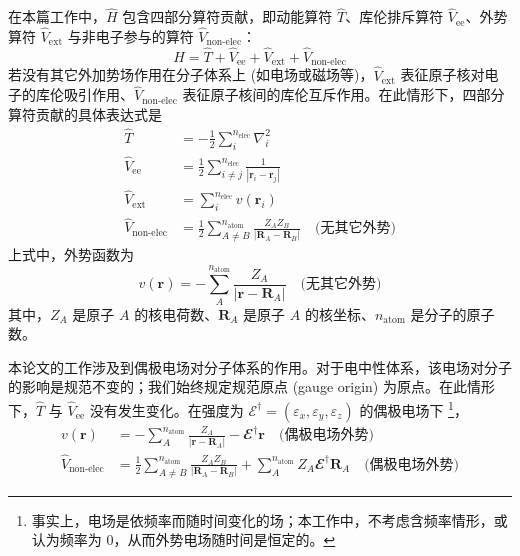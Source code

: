 在本篇工作中，$\hat H$ 包含四部分算符贡献，即动能算符 $\hat T$、库伦排斥算符 $\hat V_\mathrm{ee}$、外势算符 $\hat V_\mathrm{ext}$ 与非电子参与的算符 $\hat V_\text{non-elec}$：
\begin{equation}
  \hat H = \hat T + \hat V_\mathrm{ee} + \hat V_\mathrm{ext} + \hat V_\text{non-elec}
\end{equation}
若没有其它外加势场作用在分子体系上 (如电场或磁场等)，$\hat V_\mathrm{ext}$ 表征原子核对电子的库伦吸引作用、$\hat V_\text{non-elec}$ 表征原子核间的库伦互斥作用。在此情形下，四部分算符贡献的具体表达式是
\begin{align}
  \hat T &= - \frac{1}{2} \sum_i^{n_\mathrm{elec}} \nabla_i^2 \\
  \hat V_\mathrm{ee} &= \frac{1}{2} \sum_{i \neq j}^{n_\mathrm{elec}} \frac{1}{| \bm{r}_i - \bm{r}_j |} \\
  \hat V_\mathrm{ext} &= \sum_{i}^{n_\mathrm{elec}} v (\bm{r}_i) \\
  \hat V_\text{non-elec} &= \frac{1}{2} \sum_{A \neq B}^{n_\mathrm{atom}} \frac{Z_A Z_B}{| \bm{R}_A  - \bm{R}_B |} \quad \text{(无其它外势)}
\end{align}
上式中，外势函数为
\begin{equation}
  v (\bm{r}) = - \sum_{A}^{n_\mathrm{atom}} \frac{Z_A}{| \bm{r} - \bm{R}_A |} \quad \text{(无其它外势)}
\end{equation}
其中，$Z_A$ 是原子 $A$ 的核电荷数、$\bm{R}_A$ 是原子 $A$ 的核坐标、$n_\mathrm{atom}$ 是分子的原子数。

本论文的工作涉及到偶极电场对分子体系的作用。对于电中性体系，该电场对分子的影响是规范不变的；我们始终规定规范原点 (gauge origin) 为原点。在此情形下，$\hat T$ 与 $\hat V_\mathrm{ee}$ 没有发生变化。在强度为 $\pmb{\mathcal{E}}^\dagger = (\varepsilon_x, \varepsilon_y, \varepsilon_z)$ 的偶极电场下 \cite{Atkins-Friedman.Oxford.2011}\footnote{事实上，电场是依频率而随时间变化的场；本工作中，不考虑含频率情形，或认为频率为 0，从而外势电场随时间是恒定的。}，
\begin{align}
  v (\bm{r}) &= - \sum_{A}^{n_\mathrm{atom}} \frac{Z_A}{| \bm{r} - \bm{R}_A |} - \mathbfcal{E}^\dagger \bm{r} \quad \text{(偶极电场外势)} \\
  \hat V_\text{non-elec} &= \frac{1}{2} \sum_{A \neq B}^{n_\mathrm{atom}} \frac{Z_A Z_B}{| \bm{R}_A  - \bm{R}_B |} + \sum_{A}^{n_\mathrm{atom}} Z_A \mathbfcal{E}^\dagger \bm{R}_A \quad \text{(偶极电场外势)}
\end{align}

